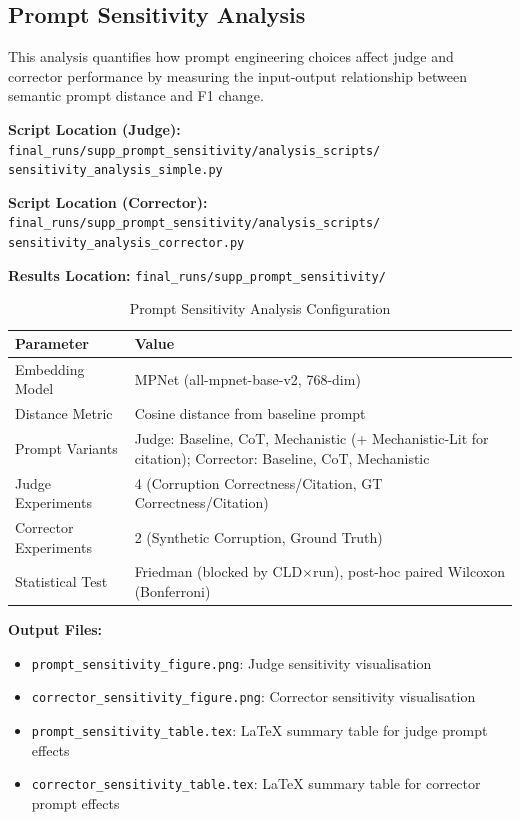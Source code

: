 \subsection{Prompt Sensitivity Analysis}

This analysis quantifies how prompt engineering choices affect judge and corrector performance by measuring the input-output relationship between semantic prompt distance and F1 change.

\textbf{Script Location (Judge):} \texttt{final\_runs/supp\_prompt\_sensitivity/analysis\_scripts/}\\
\hspace*{2em}\texttt{sensitivity\_analysis\_simple.py}

\textbf{Script Location (Corrector):} \texttt{final\_runs/supp\_prompt\_sensitivity/analysis\_scripts/}\\
\hspace*{2em}\texttt{sensitivity\_analysis\_corrector.py}

\textbf{Results Location:} \texttt{final\_runs/supp\_prompt\_sensitivity/}

\begin{table}[H]
\centering
\caption{Prompt Sensitivity Analysis Configuration}
\label{tab:prompt_sensitivity_config}
\footnotesize
\begin{tabular}{@{}ll@{}}
\toprule
\textbf{Parameter} & \textbf{Value} \\
\midrule
Embedding Model & MPNet (all-mpnet-base-v2, 768-dim) \\
Distance Metric & Cosine distance from baseline prompt \\
Prompt Variants & Judge: Baseline, CoT, Mechanistic (+ Mechanistic-Lit for citation); Corrector: Baseline, CoT, Mechanistic \\
Judge Experiments & 4 (Corruption Correctness/Citation, GT Correctness/Citation) \\
Corrector Experiments & 2 (Synthetic Corruption, Ground Truth) \\
Statistical Test & Friedman (blocked by CLD$\times$run), post-hoc paired Wilcoxon (Bonferroni) \\
\bottomrule
\end{tabular}
\end{table}

\textbf{Output Files:}
\begin{itemize}[noitemsep]
    \item \texttt{prompt\_sensitivity\_figure.png}: Judge sensitivity visualisation
    \item \texttt{corrector\_sensitivity\_figure.png}: Corrector sensitivity visualisation
    \item \texttt{prompt\_sensitivity\_table.tex}: LaTeX summary table for judge prompt effects
    \item \texttt{corrector\_sensitivity\_table.tex}: LaTeX summary table for corrector prompt effects
\end{itemize}

